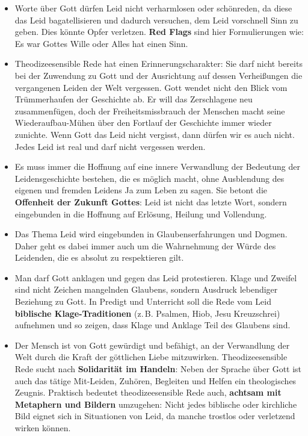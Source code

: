 \begin{itemize}
    \item Worte über Gott dürfen Leid nicht verharmlosen oder schönreden, da diese das Leid bagatellisieren und dadurch versuchen, dem Leid vorschnell Sinn zu geben. Dies könnte Opfer verletzen. \textbf{Red Flags} sind hier Formulierungen wie: \glqq Es war Gottes Wille\grqq{} oder \glqq Alles hat einen Sinn\grqq.
    \item Theodizeesensible Rede hat einen Erinnerungscharakter: Sie darf nicht bereits bei der Zuwendung zu Gott und der Ausrichtung auf dessen Verheißungen die vergangenen Leiden der Welt vergessen. Gott wendet nicht den Blick vom Trümmerhaufen der Geschichte ab. Er will das Zerschlagene neu zusammenfügen, doch der Freiheitsmissbrauch der Menschen macht seine Wiederaufbau-Mühen über den Fortlauf der Geschichte immer wieder zunichte. Wenn Gott das Leid nicht vergisst, dann dürfen wir es auch nicht. Jedes Leid ist real und darf nicht vergessen werden. 
    \item Es muss immer die Hoffnung auf eine innere Verwandlung der Bedeutung der Leidensgeschichte bestehen, die es möglich macht, ohne Ausblendung des eigenen und fremden Leidens \glqq Ja\grqq{} zum Leben zu sagen. Sie betont die \textbf{Offenheit der Zukunft Gottes}: Leid ist nicht das letzte Wort, sondern eingebunden in die Hoffnung auf Erlösung, Heilung und Vollendung.
    \item Das Thema Leid wird eingebunden in Glaubenserfahrungen und Dogmen. Daher geht es dabei immer auch um die Wahrnehmung der Würde des Leidenden, die es absolut zu respektieren gilt.
    \item Man darf Gott anklagen und gegen das Leid protestieren. Klage und Zweifel sind nicht Zeichen mangelnden Glaubens, sondern Ausdruck lebendiger Beziehung zu Gott. In Predigt und Unterricht soll die Rede vom Leid \textbf{biblische Klage-Traditionen} (z.\,B. Psalmen, Hiob, Jesu Kreuzschrei) aufnehmen und so zeigen, dass Klage und Anklage Teil des Glaubens sind.
    \item Der Mensch ist von Gott gewürdigt und befähigt, an der Verwandlung der Welt durch die Kraft der göttlichen Liebe mitzuwirken. Theodizeesensible Rede sucht nach \textbf{Solidarität im Handeln}: Neben der Sprache über Gott ist auch das tätige Mit-Leiden, Zuhören, Begleiten und Helfen ein theologisches Zeugnis. Praktisch bedeutet theodizeesensible Rede auch, \textbf{achtsam mit Metaphern und Bildern} umzugehen: Nicht jedes biblische oder kirchliche Bild eignet sich in Situationen von Leid, da manche trostlos oder verletzend wirken können.  

\end{itemize}
